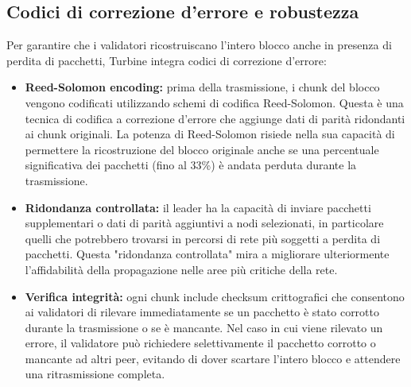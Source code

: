 \documentclass[a4paper,12pt]{report}
\begin{document}
	\subsection{Codici di correzione d’errore e robustezza}
	Per garantire che i validatori ricostruiscano l’intero blocco anche in presenza di perdita di pacchetti, Turbine integra codici di correzione d’errore:
	\begin{itemize}
		\item \textbf{Reed-Solomon encoding:} prima della trasmissione, i chunk del blocco vengono codificati utilizzando schemi di codifica Reed-Solomon. Questa è una tecnica di codifica a correzione d'errore che aggiunge dati di parità ridondanti ai chunk originali. La potenza di Reed-Solomon risiede nella sua capacità di permettere la ricostruzione del blocco originale anche se una percentuale significativa dei pacchetti (fino al 33\%) è andata perduta durante la trasmissione.
		\item \textbf{Ridondanza controllata:} il leader ha la capacità di inviare pacchetti supplementari o dati di parità aggiuntivi a nodi selezionati, in particolare quelli che potrebbero trovarsi in percorsi di rete più soggetti a perdita di pacchetti. Questa "ridondanza controllata" mira a migliorare ulteriormente l'affidabilità della propagazione nelle aree più critiche della rete.
		\item \textbf{Verifica integrità:} ogni chunk include checksum crittografici che consentono ai validatori di rilevare immediatamente se un pacchetto è stato corrotto durante la trasmissione o se è mancante. Nel caso in cui viene rilevato un errore, il validatore può richiedere selettivamente il pacchetto corrotto o mancante ad altri peer, evitando di dover scartare l'intero blocco e attendere una ritrasmissione completa.
	\end{itemize}
	
\end{document}
